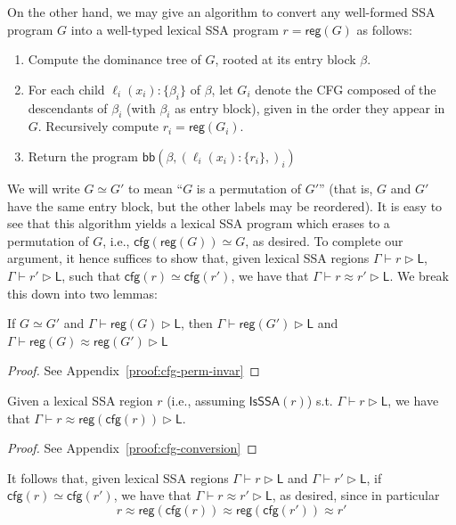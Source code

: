 \documentclass[acmsmall,screen,review]{acmart}
\newcommand{\ms}[1]{\ensuremath{\mathsf{#1}}}
\newcommand{\lto}{:}
\newcommand{\wbranch}[3]{#1(#2) \lto \{#3\}}
\newcommand{\haslb}[3]{#1 \vdash #2 \rhd #3}
\newcommand{\teqv}{\approx}
\newcommand{\lbeq}[4]{#1 \vdash #2 \teqv #3 \rhd {#4}}
\newcommand{\isssa}[1]{\ms{IsSSA}(#1)}
\newcommand{\tocfg}[1]{\ms{cfg}(#1)}
\newcommand{\adddom}[2]{\ms{bb}(#1, #2)}
\newcommand{\toreg}[1]{\ms{reg}(#1)}
\begin{document}
On the other hand, we may give an algorithm to convert any well-formed SSA program $G$ into a
well-typed lexical SSA program $r = \toreg{G}$ as follows:
\begin{enumerate}
  \item Compute the dominance tree of $G$, rooted at its entry block $\beta$.
  \item For each child $\wbranch{\ell_i}{x_i}{\beta_i}$ of $\beta$, let $G_i$ denote the CFG
  composed of the descendants of $\beta_i$ (with $\beta_i$ as entry block), given in the order they
  appear in $G$. Recursively compute $r_i = \toreg{G_i}$.
  \item Return the program $\adddom{\beta}{(\wbranch{\ell_i}{x_i}{r_i},)_i}$
\end{enumerate}
We will write $G \simeq G'$ to mean ``$G$ is a permutation of $G'$'' (that is, $G$ and $G'$ have the
same entry block, but the other labels may be reordered). It is easy to see that this algorithm
yields a lexical SSA program which erases to a permutation of $G$, i.e., $\tocfg{\toreg{G}} \simeq
G$, as desired. To complete our argument, it hence suffices to show that, given lexical SSA regions
$\haslb{\Gamma}{r}{\ms{L}}$, $\haslb{\Gamma}{r'}{\ms{L}}$, such that $\tocfg{r} \simeq \tocfg{r'}$,
we have that $\lbeq{\Gamma}{r}{r'}{\ms{L}}$. We break this down into two lemmas:
\begin{lemma}[name=Permutation Invariance, restate=cfgperminvar]
  If $G \simeq G'$ and $\haslb{\Gamma}{\toreg{G}}{\ms{L}}$, then
    $\haslb{\Gamma}{\toreg{G'}}{\ms{L}}$ and $\lbeq{\Gamma}{\toreg{G}}{\toreg{G'}}{\ms{L}}$
\end{lemma}
\begin{proof}
  See Appendix~\ref{proof:cfg-perm-invar}
\end{proof}
\begin{lemma}[name=CFG Conversion, restate=cfgconversion]
  Given a lexical SSA region $r$ (i.e., assuming $\isssa{r}$) s.t. $\haslb{\Gamma}{r}{\ms{L}}$, we
  have that $\lbeq{\Gamma}{r}{\toreg{\tocfg{r}}}{\ms{L}}$.
\end{lemma}
\begin{proof}
  See Appendix~\ref{proof:cfg-conversion}
\end{proof}

It follows that, given lexical SSA regions $\haslb{\Gamma}{r}{\ms{L}}$ and
$\haslb{\Gamma}{r'}{\ms{L}}$, if $\tocfg{r} \simeq \tocfg{r'}$, we have that
$\lbeq{\Gamma}{r}{r'}{\ms{L}}$, as desired, since in particular
\begin{equation}
  r \teqv \toreg{\tocfg{r}} \teqv \toreg{\tocfg{r'}} \teqv r'
\end{equation}
\end{document}
